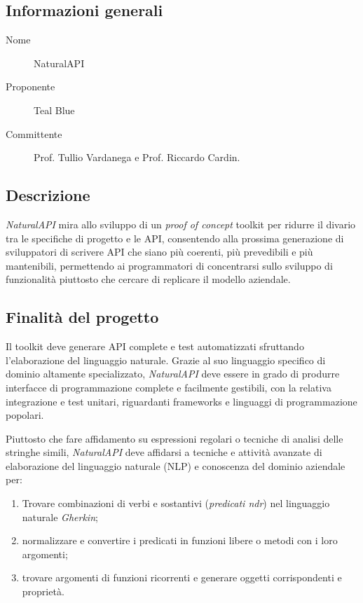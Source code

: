 \documentclass[../studio-di-fattibilita.tex]{subfiles}
\begin{document}
  \subsection{Informazioni generali}%
  \label{subsec:informazioni_generali}
  \begin{description}
    \item[Nome] NaturalAPI
    \item[Proponente] Teal Blue
    \item[Committente] Prof. Tullio Vardanega e Prof. Riccardo Cardin.
  \end{description}


  \subsection{Descrizione}%
  \label{subsec:descrizione}
  \textit{NaturalAPI} mira allo sviluppo di un \textit{proof of concept} toolkit per ridurre il divario tra le specifiche di progetto e le API, consentendo alla prossima generazione di sviluppatori di scrivere API che siano più coerenti, più prevedibili e più mantenibili, permettendo ai programmatori di concentrarsi sullo sviluppo di funzionalità piuttosto che cercare di replicare il modello aziendale.


  \subsection{Finalità del progetto}%
  \label{subsec:finalita_del_progetto}
  Il toolkit deve generare API complete e test automatizzati sfruttando l'elaborazione del linguaggio naturale.
  Grazie al suo linguaggio specifico di dominio altamente specializzato, \textit{NaturalAPI} deve essere in grado di produrre interfacce di programmazione complete e facilmente gestibili, con la relativa integrazione e test unitari, riguardanti frameworks e linguaggi di programmazione popolari.

  Piuttosto che fare affidamento su espressioni regolari o tecniche di analisi delle stringhe simili, \textit{NaturalAPI} deve affidarsi a tecniche e attività avanzate di elaborazione del linguaggio naturale (NLP) e conoscenza del dominio aziendale per:
    \begin{enumerate}
      \item Trovare combinazioni di verbi e sostantivi (\textit{predicati ndr}) nel linguaggio naturale \textit{Gherkin};
      \item normalizzare e convertire i predicati in funzioni libere o metodi con i loro argomenti;
      \item trovare argomenti di funzioni ricorrenti e generare oggetti corrispondenti e proprietà.
    \end{enumerate}
\end{document}
